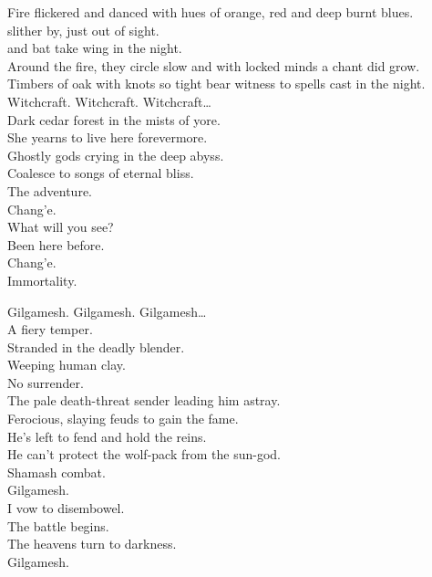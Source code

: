 
Fire flickered and danced with hues of orange, red and deep burnt blues. \\
 slither by, just out of sight. \\
 and bat take wing in the night. \\
Around the fire, they circle slow and with locked minds a chant did grow. \\
Timbers of oak with knots so tight bear witness to spells cast in the night. \\

Witchcraft. Witchcraft. Witchcraft… \\

Dark cedar forest in the mists of yore. \\
She yearns to live here forevermore. \\
Ghostly gods crying in the deep abyss. \\
Coalesce to songs of eternal bliss. \\

The adventure. \\
Chang'e. \\
What will you see? \\
Been here before. \\
Chang'e. \\
Immortality. \\



Gilgamesh. Gilgamesh. Gilgamesh… \\

A fiery temper. \\
Stranded in the deadly blender. \\
Weeping human clay. \\
No surrender. \\
The pale death-threat sender leading him astray. \\
Ferocious, slaying feuds to gain the fame. \\
He's left to fend and hold the reins. \\
He can't protect the wolf-pack from the sun-god. \\
Shamash combat. \\

Gilgamesh. \\
I vow to disembowel. \\
The battle begins. \\
The heavens turn to darkness. \\
Gilgamesh. \\

